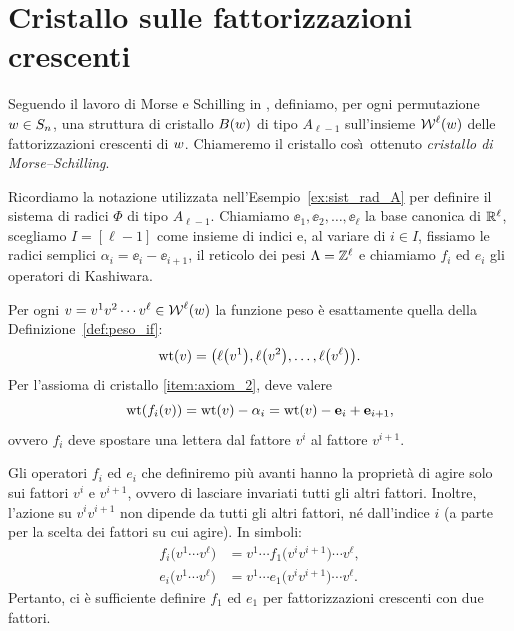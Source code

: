 

\section{Cristallo sulle fattorizzazioni crescenti}
\label{sec:cristallo_morse_schilling}



Seguendo il lavoro di Morse e Schilling in \cite[Section~3]{morse-schilling-15},
definiamo, per ogni permutazione $w \in S_n$, 
una struttura di cristallo $B(w)$ di tipo $A_{\ell-1}$
sull'insieme $\operatorname{\mathcal{W}}^\ell(w)$ delle fattorizzazioni crescenti di $w$.
Chiameremo il cristallo cos\`\i\ ottenuto \emph{cristallo di Morse--Schilling}.

Ricordiamo la notazione utilizzata nell'Esempio~\ref{ex:sist_rad_A}
per definire il sistema di radici $\Phi$ di tipo $A_{\ell-1}$.
Chiamiamo $\ee_1, \ee_2, \dots, \ee_\ell$ la base canonica di $\mathbb{R}^\ell$,
scegliamo $I = [\ell-1]$ come insieme di indici e, 
al variare di $i \in I$, 
fissiamo le radici semplici $\alpha_i = \ee_i - \ee_{i+1}$,
il reticolo dei pesi $\Lambda = \mathbb{Z}^\ell$
e chiamiamo $f_i$ ed $e_i$ gli operatori di Kashiwara.

Per ogni $v = v^1 v^2 \cdots v^\ell \in \operatorname{\mathcal{W}}^\ell(w)$ la funzione peso \`e esattamente
quella della Definizione~\ref{def:peso_if}:
\[
    \operatorname{wt}(v) = \bigl( \operatorname{\ell}\bigl(v^1\bigr), \operatorname{\ell}\bigl(v^2\bigr), \dots, \operatorname{\ell}\bigl(v^\ell\bigr) \bigr).
\]
Per l'assioma di cristallo \ref{item:axiom_2},
deve valere
\[
    \operatorname{wt}(f_i (v)) = \operatorname{wt}(v) - \alpha_i = \operatorname{wt}(v) - \mathbf{e}_i + \mathbf{e}_{i+1},
\]
ovvero $f_i$ deve spostare una lettera dal fattore $v^i$ al fattore $v^{i+1}$.

Gli operatori $f_i$ ed $e_i$ che definiremo pi\`u avanti hanno la propriet\`a di
agire solo sui fattori $v^i$ e $v^{i+1}$, ovvero di lasciare invariati tutti gli
altri fattori.
Inoltre, l'azione su $v^i v^{i+1}$ non dipende da tutti gli altri fattori, 
n\'e dall'indice $i$ (a parte per la scelta dei fattori su cui agire).
In simboli:
\begin{align*}
    f_i \bigl( v^1 \cdots v^\ell \bigr) &= v^1 \cdots f_1\bigl( v^i v^{i+1} \bigr) \cdots v^\ell, \\
    e_i \bigl( v^1 \cdots v^\ell \bigr) &= v^1 \cdots e_1\bigl( v^i v^{i+1} \bigr) \cdots v^\ell.
\end{align*}
Pertanto, ci \`e sufficiente definire $f_1$ ed $e_1$ per fattorizzazioni crescenti
con due fattori.


